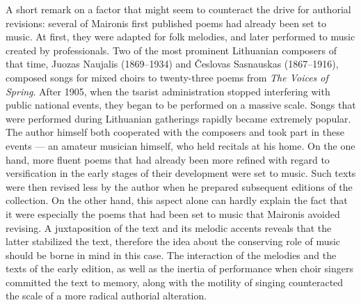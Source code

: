 \begin{paper}
A short remark on a factor that might seem to counteract the drive for
authorial revisions: several of Maironis first published poems had already been set to music. At first, they were adapted for folk melodies, and
later performed to music created by professionals. Two of the most prominent Lithuanian
composers of that time, Juozas Naujalis (1869--1934) and Česlovas
Sasnauskas (1867--1916), composed songs for mixed choirs to twenty-three
poems from \emph{The Voices of Spring}. After 1905, when the
tsarist administration stopped interfering with public national events,
they began to be performed on a massive scale. Songs that were performed during Lithuanian
gatherings rapidly became extremely popular. The author himself both cooperated
with the composers and took part in these events --- an
amateur musician himself, who held recitals at his home. On the one hand, more
fluent poems that had already been more refined with regard to versification 
in the early stages of their development were set to music. Such texts
were then revised less by the author when he prepared subsequent
editions of the collection. On the other hand, this aspect alone can hardly
explain the fact that it were especially the poems that had been set to music that
Maironis avoided revising. A juxtaposition of the text and its
melodic accents reveals that the latter stabilized the text, therefore
the idea about the conserving role of music should be borne in mind in
this case. The interaction of the melodies and the texts of the early
edition, as well as the inertia of performance when choir singers
committed the text to memory, along with the motility of singing counteracted
the scale of a more radical authorial alteration.


\end{paper}
